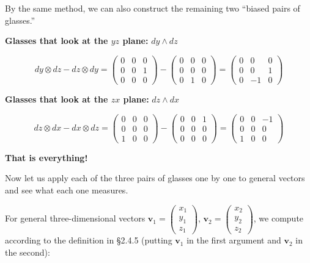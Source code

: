 By the same method, we can also construct the remaining two ``biased
pairs of glasses.''

\textbf{Glasses that look at the \(yz\) plane:} \(dy \wedge dz\)

\[
dy \otimes dz - dz \otimes dy = \begin{pmatrix} 0 & 0 & 0 \\ 0 & 0 & 1 \\ 0 & 0 & 0 \end{pmatrix} - \begin{pmatrix} 0 & 0 & 0 \\ 0 & 0 & 0 \\ 0 & 1 & 0 \end{pmatrix} = \begin{pmatrix} 0 & 0 & 0 \\ 0 & 0 & 1 \\ 0 & -1 & 0 \end{pmatrix}
\]

\textbf{Glasses that look at the \(zx\) plane:} \(dz \wedge dx\)

\[
dz \otimes dx - dx \otimes dz = \begin{pmatrix} 0 & 0 & 0 \\ 0 & 0 & 0 \\ 1 & 0 & 0 \end{pmatrix} - \begin{pmatrix} 0 & 0 & 1 \\ 0 & 0 & 0 \\ 0 & 0 & 0 \end{pmatrix} = \begin{pmatrix} 0 & 0 & -1 \\ 0 & 0 & 0 \\ 1 & 0 & 0 \end{pmatrix}
\]

\textbf{That is everything!}

Now let us apply each of the three pairs of glasses one by one to
general vectors and see what each one measures.

For general three-dimensional vectors
\(\mathbf{v}_1 = \begin{pmatrix} x_1 \\ y_1 \\ z_1 \end{pmatrix}\),
\(\mathbf{v}_2 = \begin{pmatrix} x_2 \\ y_2 \\ z_2 \end{pmatrix}\), we
compute according to the definition in §2.4.5 (putting \(\mathbf{v}_1\)
in the first argument and \(\mathbf{v}_2\) in the second):

